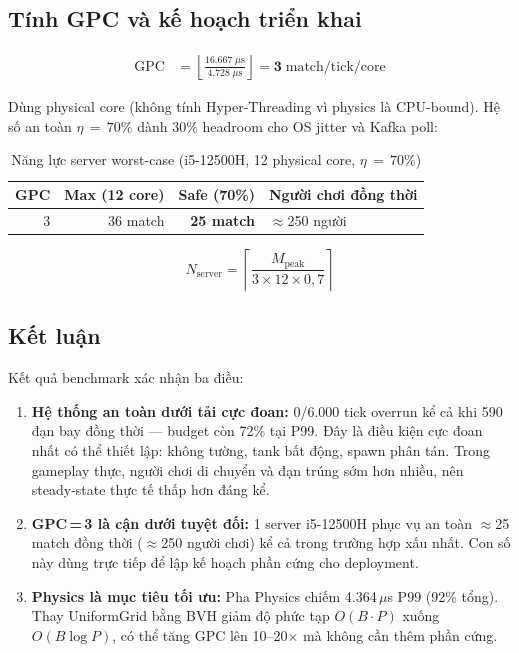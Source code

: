 \documentclass[12pt,a4paper]{report}
\begin{document}
\subsection{Tính GPC và kế hoạch triển khai}

\begin{align}
  \text{GPC} &= \left\lfloor \frac{16.667\;\mu\text{s}}{4.728\;\mu\text{s}} \right\rfloor
  = \mathbf{3}\;\text{match/tick/core}
\end{align}

\noindent Dùng physical core (không tính Hyper-Threading vì physics là CPU-bound).
Hệ số an toàn $\eta\,=\,70\%$ dành 30\% headroom cho OS jitter và Kafka poll:

\begin{table}[H]
\centering
\caption{Năng lực server worst-case (i5-12500H, 12 physical core, $\eta\,=\,70\%$)}
\label{tab:gpc_capacity}
\begin{tabular}{rrrl}
\toprule
\textbf{GPC} & \textbf{Max (12 core)} & \textbf{Safe (70\%)} & \textbf{Người chơi đồng thời} \\
\midrule
3 & 36 match & \textbf{25 match} & $\approx$250 người \\
\bottomrule
\end{tabular}
\end{table}

\[
  \boxed{N_{\text{server}} = \left\lceil \frac{M_{\text{peak}}}{3 \times 12 \times 0{,}7} \right\rceil}
\]

\subsection{Kết luận}

Kết quả benchmark xác nhận ba điều:

\begin{enumerate}
  \item \textbf{Hệ thống an toàn dưới tải cực đoan:} 0/6.000 tick overrun
        kể cả khi 590 đạn bay đồng thời --- budget còn 72\% tại P99.
        Đây là điều kiện cực đoan nhất có thể thiết lập: không tường, tank
        bất động, spawn phân tán. Trong gameplay thực, người chơi di chuyển
        và đạn trúng sớm hơn nhiều, nên steady-state thực tế thấp hơn đáng kể.

  \item \textbf{GPC\,=\,3 là cận dưới tuyệt đối:} 1 server i5-12500H phục vụ
        an toàn $\approx$25 match đồng thời ($\approx$250 người chơi) kể cả
        trong trường hợp xấu nhất. Con số này dùng trực tiếp để lập kế hoạch
        phần cứng cho deployment.

  \item \textbf{Physics là mục tiêu tối ưu:} Pha Physics chiếm 4.364\,$\mu$s
        P99 (92\% tổng). Thay UniformGrid bằng BVH giảm độ phức tạp
        $O(B\!\cdot\!P)$ xuống $O(B\!\log\!P)$, có thể tăng GPC lên 10--20×
        mà không cần thêm phần cứng.
\end{enumerate}
\end{document}
